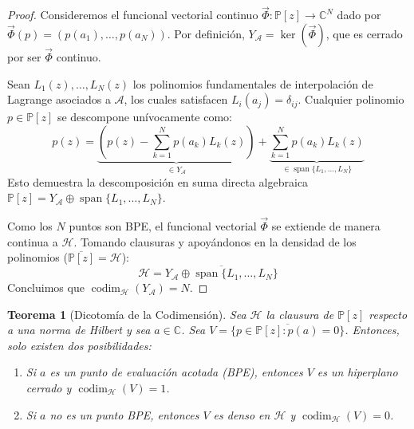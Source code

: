 \documentclass[12pt,a4paper]{article}
\newtheorem{theorem}{Teorema}
\theoremstyle{definition}
\theoremstyle{remark}
\newcommand{\C}{\mathbb{C}}
\newcommand{\Poly}{\mathbb{P}[z]}
\begin{document}
\begin{proof}
  Consideremos el funcional vectorial continuo $\vec{\Phi}: \Poly \to \mathbb{C}^N$ dado por $\vec{\Phi}(p) = (p(a_1), \dots, p(a_N))$. Por definición, $Y_{\mathcal{A}} = \ker(\vec{\Phi})$, que es cerrado por ser $\vec{\Phi}$ continuo.

  Sean $L_1(z), \dots, L_N(z)$ los polinomios fundamentales de interpolación de Lagrange asociados a $\mathcal{A}$, los cuales satisfacen $L_i(a_j) = \delta_{ij}$. Cualquier polinomio $p \in \Poly$ se descompone unívocamente como:
  $$p(z) = \underbrace{\left( p(z) - \sum_{k=1}^N p(a_k)L_k(z) \right)}_{\in Y_{\mathcal{A}}} + \underbrace{\sum_{k=1}^N p(a_k)L_k(z)}_{\in \operatorname{span}\{L_1, \dots, L_N\}}$$
  Esto demuestra la descomposición en suma directa algebraica $\Poly = Y_{\mathcal{A}} \oplus \operatorname{span}\{L_1, \dots, L_N\}$.

  Como los $N$ puntos son BPE, el funcional vectorial $\vec{\Phi}$ se extiende de manera continua a $\mathcal{H}$. Tomando clausuras y apoyándonos en la densidad de los polinomios ($\overline{\Poly} = \mathcal{H}$):
  $$\mathcal{H} = \overline{Y_{\mathcal{A}} \oplus \operatorname{span}\{L_1, \dots, L_N\}}$$
  Concluimos que $\operatorname{codim}_{\mathcal{H}}(Y_{\mathcal{A}}) = N$.
\end{proof}

\begin{theorem}[Dicotomía de la Codimensión]
  \label{thm:dicotomia}
  Sea $\mathcal{H}$ la clausura de $\Poly$ respecto a una norma de Hilbert y sea $a \in \C$. Sea $V = \overline{\{p \in \Poly : p(a)=0\}}$. Entonces, solo existen dos posibilidades:
  \begin{enumerate}
    \item Si $a$ es un punto de evaluación acotada (BPE), entonces $V$ es un hiperplano cerrado y $\operatorname{codim}_{\mathcal{H}}(V) = 1$.
    \item Si $a$ no es un punto BPE, entonces $V$ es denso en $\mathcal{H}$ y $\operatorname{codim}_{\mathcal{H}}(V) = 0$.
  \end{enumerate}
\end{theorem}
\end{document}
